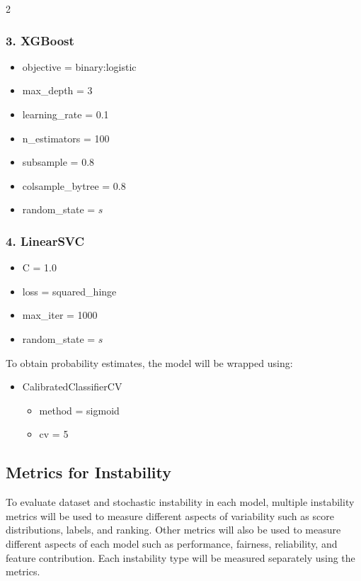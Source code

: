\documentclass[12pt]{article}
\begin{document}
\begin{multicols}{2}
 \subsubsection*{3. XGBoost}
 \begin{itemize}
  \item objective = binary:logistic
  \item max\_depth = 3
  \item learning\_rate = 0.1
  \item n\_estimators = 100
  \item subsample = 0.8
  \item colsample\_bytree = 0.8
  \item random\_state = $s$
 \end{itemize}

 \columnbreak

 \subsubsection*{4. LinearSVC}
 \begin{itemize}
  \item C = 1.0
  \item loss = squared\_hinge
  \item max\_iter = 1000
  \item random\_state = $s$
 \end{itemize}

 To obtain probability estimates, the model will be wrapped using:
 \begin{itemize}
  \item CalibratedClassifierCV
  \begin{itemize}
    \item method = sigmoid
    \item cv = 5
  \end{itemize}
 \end{itemize}
\end{multicols}

\subsection{Metrics for Instability}
To evaluate dataset and stochastic instability in each model, multiple instability metrics will be used to measure different aspects of variability such as score distributions, labels, and ranking. Other metrics will also be used to measure different aspects of each model such as performance, fairness, reliability, and feature contribution. Each instability type will be measured separately using the metrics.\\
\end{document}
